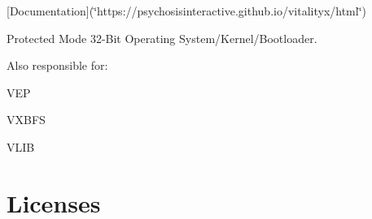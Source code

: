 \href{https://app.fossa.com/projects/git%2Bgithub.com%2Fryelow90210%2FVitalityX?ref=badge_shield}{\tt }   

\mbox{[}Documentation\mbox{]}(\char`\"{}https\+://psychosisinteractive.\+github.\+io/vitalityx/html\char`\"{})

Protected Mode 32-\/\+Bit Operating System/\+Kernel/\+Bootloader.

Also responsible for\+:
\begin{DoxyEnumerate}
\item V\+EP
\item V\+X\+B\+FS
\item V\+L\+IB
\end{DoxyEnumerate}\hypertarget{a00350_autotoc_md15}{}\section{Licenses}\label{a00350_autotoc_md15}
\href{https://app.fossa.com/projects/git%2Bgithub.com%2Fryelow90210%2FVitalityX?ref=badge_large}{\tt }

